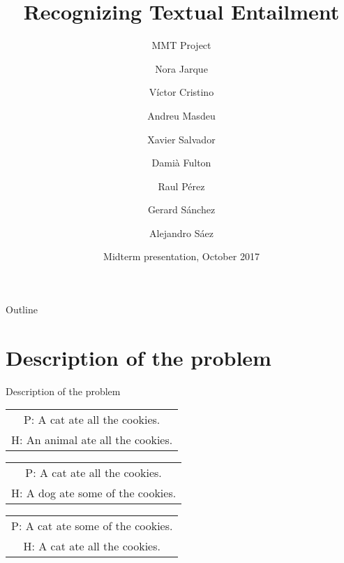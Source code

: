 \documentclass{beamer}
\title{Recognizing Textual Entailment}
\subtitle{MMT Project}
\author{ Nora Jarque \and V\'ictor Cristino \and Andreu Masdeu \and Xavier Salvador \and Dami\`a Fulton \and Raul P\'erez \and Gerard S\'anchez    \and Alejandro S\'aez}
\date{Midterm presentation, October 2017}
\begin{document}
\begin{frame}
  \titlepage
\end{frame}

\begin{frame}{Outline}
  \tableofcontents
\end{frame}

\section{Description of the problem}


\begin{frame}{Description of the problem}        \centering    
    
    \begin{tabular}{c}
        P: A cat ate all the cookies. \\
        H: An animal ate all the cookies.\\
    \end{tabular}
    
    \bigskip
    
    \color{gray}
    
    \begin{tabular}{c}
        P: A cat ate all the cookies. \\
        H: A dog ate some of the cookies.\\
    \end{tabular}
    
    \bigskip
    
    \begin{tabular}{c}
        P: A cat ate some of the cookies. \\
        H: A cat ate all the cookies.\\
    \end{tabular}
\end{frame}
\end{document}
